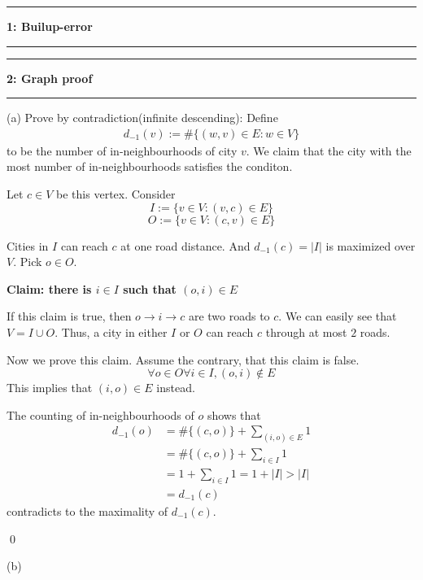 \documentclass[11pt]{article}
\newcommand\question[2]{\vspace{.25in}\hrule\textbf{#1: #2}\vspace{.5em}\hrule\vspace{.10in}}
\begin{document}
\raggedright
\newcommand\NAME{Carl Kingsford}  %
\newcommand\ANDREWID{ckingsf}     %
\newcommand\HWNUM{1}              %



\question{1}{Builup-error} 


\question{2}{Graph proof}
(a)
Prove by contradiction(infinite descending):
Define
\begin{align*}
    d_{-1}(v) := \#\{(w, v)\in E: w\in V\}
\end{align*}
to be the number of in-neighbourhoods of city $v$.
We claim that the city with the most number of in-neighbourhoods satisfies the conditon.

Let $c\in V$ be this vertex. Consider
\[I := \{v\in V: (v, c)\in E\}\]
\[O := \{v\in V: (c, v)\in E\}\]

Cities in $I$ can reach $c$ at one road distance. And $d_{-1}(c) = |I|$ is maximized over $V$.
Pick $o\in O$.

\textbf{Claim: there is $i \in I$ such that $(o, i)\in E$}

If this claim is true, then $o\to i\to c$ are two roads to $c$.
We can easily see that $V = I\cup O$. Thus, a city in either $I$ or $O$ can reach $c$ through at most $2$ roads.

Now we prove this claim. Assume the contrary, that this claim is false.
\[\forall o\in O\forall i\in I, (o, i)\not \in E\]
This implies that $(i, o)\in E$ instead. 

The counting of in-neighbourhoods of $o$ shows that
\begin{align*} 
    d_{-1}(o) &= \#\{(c, o)\} + \sum_{(i, o)\in E}1\\
              &=\#\{(c, o)\} + \sum_{i\in I}1 \\ 
              &= 1 + \sum_{i\in I}1 = 1 + |I| > |I|\\
              &= d_{-1}(c)
\end{align*}
contradicts to the maximality of $d_{-1}(c)$. 

\qed

(b)
\end{document}
